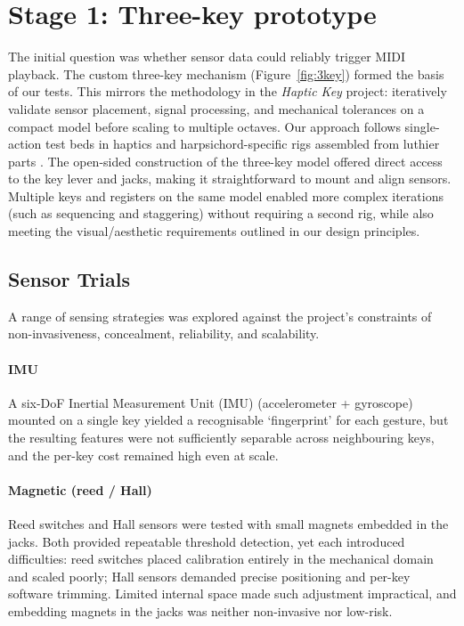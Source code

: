 \section{Stage 1: Three-key prototype}\label{sec:prototype}

The initial question was whether sensor data could reliably trigger MIDI playback. The custom three-key mechanism (Figure~\ref{fig:3key}) formed the basis of our tests. This mirrors the methodology in the \textcite{timmermans_multibody-based_2020} \emph{Haptic Key} project: iteratively validate sensor placement, signal processing, and mechanical tolerances on a compact model before scaling to multiple octaves. Our approach follows single-action test beds in haptics \cite{gillespie_haptic_1996} and harpsichord-specific rigs assembled from luthier parts \cite{perng_physical_2012}. The open-sided construction of the three-key model offered direct access to the key lever and jacks, making it straightforward to mount and align sensors. Multiple keys and registers on the same model enabled more complex iterations (such as sequencing and staggering) without requiring a second rig, while also meeting the visual/aesthetic requirements outlined in our design principles. 

\subsection{Sensor Trials}\label{failed-sensors}

A range of sensing strategies was explored against the project’s constraints of non-invasiveness, concealment, reliability, and scalability.

\paragraph{IMU}
A six-DoF Inertial Measurement Unit (IMU) (accelerometer + gyroscope) mounted on a single key yielded a recognisable `fingerprint' for each gesture, but the resulting features were not sufficiently separable across neighbouring keys, and the per-key cost remained high even at scale.

\paragraph{Magnetic (reed / Hall)}
Reed switches and Hall sensors were tested with small magnets embedded in the jacks. Both provided repeatable threshold detection, yet each introduced difficulties: reed switches placed calibration entirely in the mechanical domain and scaled poorly; Hall sensors demanded precise positioning and per-key software trimming. Limited internal space made such adjustment impractical, and embedding magnets in the jacks was neither non-invasive nor low-risk.

